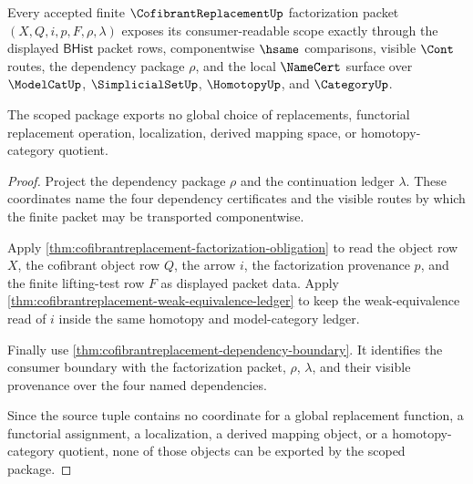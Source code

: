 \begin{theorem}
\label{thm:cofibrantreplacement-scoped-kernel-dependency-package}
Every accepted finite $\CofibrantReplacementUp$ factorization packet $(X,Q,i,p,F,\rho,\lambda)$ exposes its consumer-readable scope exactly through the displayed $\mathsf{BHist}$ packet rows, componentwise $\hsame$ comparisons, visible $\Cont$ routes, the dependency package $\rho$, and the local $\NameCert$ surface over $\ModelCatUp$, $\SimplicialSetUp$, $\HomotopyUp$, and $\CategoryUp$.

The scoped package exports no global choice of replacements, functorial replacement operation, localization, derived mapping space, or homotopy-category quotient.
\end{theorem}
\begin{proof}
Project the dependency package $\rho$ and the continuation ledger $\lambda$. These coordinates name the four dependency certificates and the visible routes by which the finite packet may be transported componentwise.

Apply \autoref{thm:cofibrantreplacement-factorization-obligation} to read the object row $X$, the cofibrant object row $Q$, the arrow $i$, the factorization provenance $p$, and the finite lifting-test row $F$ as displayed packet data. Apply \autoref{thm:cofibrantreplacement-weak-equivalence-ledger} to keep the weak-equivalence read of $i$ inside the same homotopy and model-category ledger.

Finally use \autoref{thm:cofibrantreplacement-dependency-boundary}. It identifies the consumer boundary with the factorization packet, $\rho$, $\lambda$, and their visible provenance over the four named dependencies.

Since the source tuple contains no coordinate for a global replacement function, a functorial assignment, a localization, a derived mapping object, or a homotopy-category quotient, none of those objects can be exported by the scoped package.
\end{proof}

